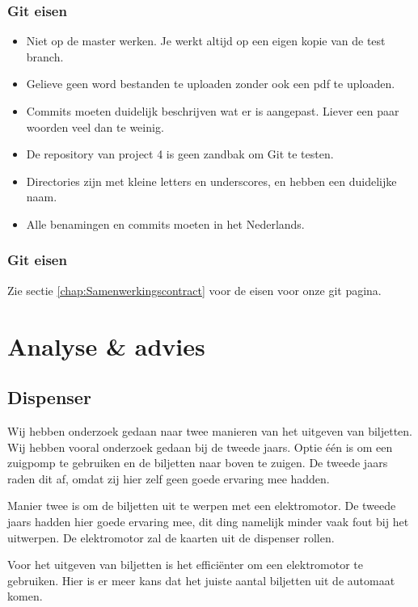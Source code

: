 \documentclass{article}
\begin{document}
\subsubsection{Git eisen}
\begin{itemize}
        \item Niet op de master werken. Je werkt altijd op een eigen kopie van de test branch.
        \item Gelieve geen word bestanden te uploaden zonder ook een pdf te uploaden.
        \item Commits moeten duidelijk beschrijven wat er is aangepast. Liever een paar woorden veel dan te weinig.
        \item De repository van project 4 is geen zandbak om Git te testen.
        \item Directories zijn met kleine letters en underscores, en hebben een duidelijke naam.
        \item Alle benamingen en commits moeten in het Nederlands.
\end{itemize}

\subsubsection{Git eisen}
Zie sectie \ref{chap:Samenwerkingscontract} voor de eisen voor onze git pagina.

\section{Analyse \& advies}

\subsection{Dispenser}

Wij hebben onderzoek gedaan naar twee manieren van het uitgeven van biljetten.
Wij hebben vooral onderzoek gedaan bij de tweede jaars.
Optie \'e\'en is om een zuigpomp te gebruiken en de biljetten naar boven te zuigen.
De tweede jaars raden dit af, omdat zij hier zelf geen goede ervaring mee hadden.

Manier twee is om de biljetten uit te werpen met een elektromotor.
De tweede jaars hadden hier goede ervaring mee, dit ding namelijk minder vaak fout bij het uitwerpen.
De elektromotor zal de kaarten uit de dispenser rollen.

Voor het uitgeven van biljetten is het effici\"enter om een elektromotor te gebruiken.
Hier is er meer kans dat het juiste aantal biljetten uit de automaat komen.
\end{document}
